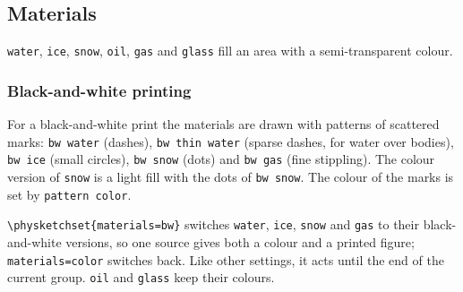 \documentclass[a4paper,11pt]{article}
\newcommand\key[1]{\texttt{#1}}
\begin{document}
\subsection{Materials}\label{sec:materials}
\key{water}, \key{ice}, \key{snow}, \key{oil}, \key{gas} and \key{glass}
fill an area with a semi-transparent colour.
\begin{example}
\end{example}
\begin{tcolorbox}[colback=black!3, colframe=black!30, boxrule=0.4pt, arc=1mm]
\centering
{}
\end{tcolorbox}

\subsubsection*{Black-and-white printing}
For a black-and-white print the materials are drawn with patterns of
scattered marks: \key{bw water} (dashes), \key{bw thin water} (sparse
dashes, for water over bodies), \key{bw ice} (small circles), \key{bw snow}
(dots) and \key{bw gas} (fine stippling). The colour version of \key{snow}
is a light fill with the dots of \key{bw snow}. The colour of the marks is
set by \key{pattern color}.
\begin{example}
\end{example}
\begin{tcolorbox}[colback=white, colframe=black!30, boxrule=0.4pt, arc=1mm]
\centering
{}
\end{tcolorbox}
\noindent\verb|\physketchset{materials=bw}| switches \key{water}, \key{ice},
\key{snow} and \key{gas} to their black-and-white versions, so one source
gives both a colour and a printed figure; \verb|materials=color| switches
back. Like other settings, it acts until the end of the current group.
\key{oil} and \key{glass} keep their colours.
\end{document}
